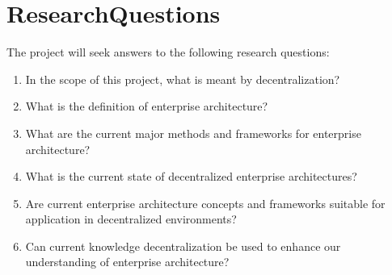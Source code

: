 \chapter{ResearchQuestions}
The project will seek answers to the following research questions:
\begin{enumerate}
\item In the scope of this project, what is meant by decentralization?
\item What is the definition of enterprise architecture?
\item What are the current major methods and frameworks for enterprise architecture?
\item What is the current state of decentralized enterprise architectures?
\item Are current enterprise architecture concepts and frameworks suitable for application in decentralized environments?
\item Can current knowledge decentralization be used to enhance our understanding of enterprise architecture?
\end{enumerate}